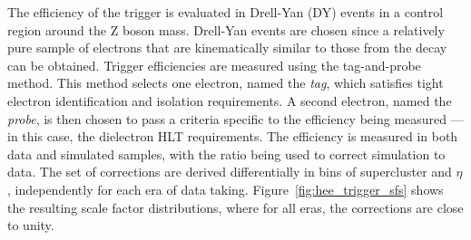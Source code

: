 The efficiency of the trigger is evaluated in Drell-Yan (DY) \Zee events in a control region around the $\mathrm{Z}$ boson mass.
Drell-Yan events are chosen since a relatively pure sample of electrons that are kinematically similar to those from the \Hee decay can be obtained.
Trigger efficiencies are measured using the tag-and-probe~\cite{TagAndProbe} method.  
This method selects one electron, named the \textit{tag}, which satisfies tight electron identification and isolation requirements. A second electron, named the \textit{probe}, is then chosen to pass a criteria specific to the efficiency being measured --- in this case, the dielectron HLT requirements.
The efficiency is measured in both data and simulated samples, with the ratio being used to correct simulation to data.
The set of corrections are derived differentially in bins of supercluster \pt and $\eta$, independently for each era of data taking.
Figure~\ref{fig:hee_trigger_sfs} shows the resulting scale factor distributions, where for all eras, the corrections are close to unity.



